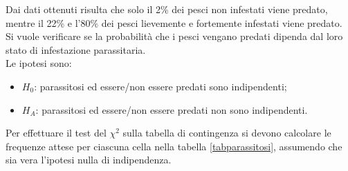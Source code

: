 \documentclass[10pt, draft]{book}
\newcommand{\tightlist}{%
\setlength{\itemsep}{1pt}\setlength{\parskip}{0pt}\setlength{\parsep}{0pt}}
\newcounter{example}[section]
\begin{document}
\begin{example}
\begin{figure}[H]
    \caption{\small{}}
    \end{figure}
Dai dati ottenuti risulta che solo il 2\% dei pesci non infestati viene predato, mentre il 22\% e l'80\% dei pesci lievemente e fortemente infestati viene predato.
\\
Si vuole verificare se la probabilità che i pesci vengano predati dipenda dal loro stato di infestazione parassitaria.
\\
Le ipotesi sono:
\begin{itemize} \tightlist
    \item $H_0$: parassitosi ed essere/non essere predati sono indipendenti;
    \item $H_A$: parassitosi ed essere/non essere predati non sono indipendenti.
\end{itemize}
Per effettuare il test del $\chi^2$ sulla tabella di contingenza si devono calcolare le frequenze attese per ciascuna cella nella tabella \ref{tabparassitosi}, assumendo che sia vera l'ipotesi nulla di indipendenza.


\end{example}
\end{document}

